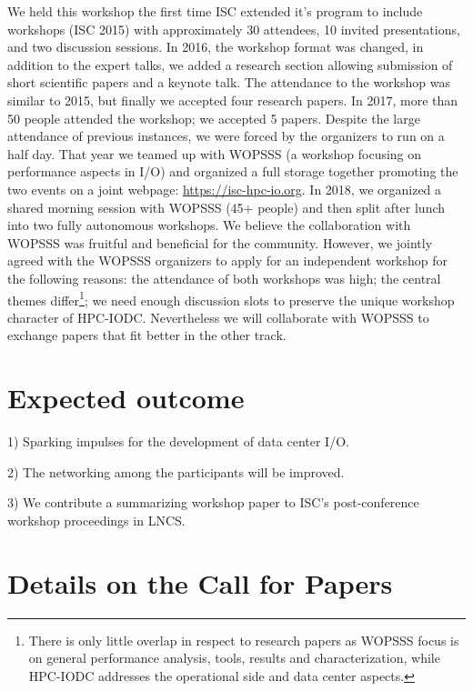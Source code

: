 \documentclass[a4paper,10pt]{article}
\begin{document}
We held this workshop the first time ISC extended it's program to include workshops (ISC 2015) with approximately 30 attendees, 10 invited presentations, and two discussion sessions.
In 2016, the workshop format was changed, in addition to the expert talks, we added a research section allowing submission of short scientific papers and a keynote talk.
The attendance to the workshop was similar to 2015, but finally we accepted four research papers.
In 2017, more than 50 people attended the workshop; we accepted 5 papers. %
Despite the large attendance of previous instances, we were forced by the organizers to run on a half day.
That year we teamed up with WOPSSS (a workshop focusing on performance aspects in I/O) and organized a full storage together promoting the two events on a joint webpage: \url{https://isc-hpc-io.org}.
In 2018, we organized a shared morning session with WOPSSS (45+ people) and then split after lunch into two fully autonomous workshops.
We believe the collaboration with WOPSSS was fruitful and beneficial for the community.
However, we jointly agreed with the WOPSSS organizers to apply for an independent workshop for the following reasons: the attendance of both workshops was high; the central themes differ\footnote{There is only little overlap in respect to research papers as WOPSSS focus is on general performance analysis, tools, results and characterization, while HPC-IODC addresses the operational side and data center aspects.}; we need enough discussion slots to preserve the unique workshop character of HPC-IODC.
Nevertheless we will collaborate with WOPSSS to exchange papers that fit better in the other track.


\section{Expected outcome}
1) Sparking impulses for the development of data center I/O.

2) The networking among the participants will be improved.

3) We contribute a summarizing workshop paper to ISC's post-conference workshop proceedings in LNCS.

\section{Details on the Call for Papers}
\end{document}

